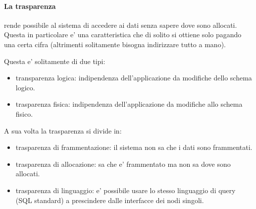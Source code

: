 \paragraph{La trasparenza} rende possibile al sistema di accedere ai dati senza sapere dove sono allocati. Questa in particolare e' una caratteristica che di solito si ottiene solo pagando una certa cifra (altrimenti solitamente bisogna indirizzare tutto a mano).

Questa e' solitamente di due tipi:

\begin{itemize}
  \item transparenza logica: indipendenza dell'applicazione da modifiche dello schema logico.
  \item trasparenza fisica: indipendenza dell'applicazione da modifiche allo schema fisico.
\end{itemize}

A sua volta la trasparenza si divide in:

\begin{itemize}
  \item trasparenza di frammentazione: il sistema non sa che i dati sono frammentati.
  \item trasparenza di allocazione: sa che e' frammentato ma non sa dove sono allocati.
  \item trasparenza di linguaggio: e' possibile usare lo stesso linguaggio di query (SQL standard) a prescindere dalle interfacce dei nodi singoli.
\end{itemize}
